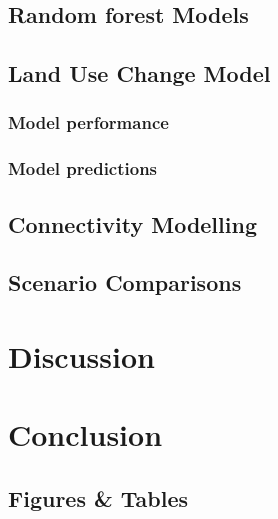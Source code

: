 \subsection{Random forest Models}

\subsection{Land Use Change Model}

\subsubsection{Model performance}

\subsubsection{Model predictions}

\subsection{Connectivity Modelling}

\subsection{Scenario Comparisons}

\section{Discussion}

\section{Conclusion}


\newpage
\begin{center}
\section*{Figures \& Tables}
\end{center}


